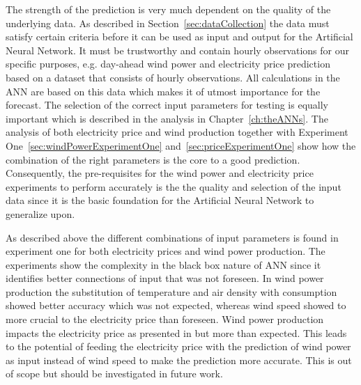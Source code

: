 The strength of the prediction is very much dependent on the quality of the underlying data. As described in Section~\ref{sec:dataCollection} the data must satisfy certain criteria before it can be used as input and output for the Artificial Neural Network. It must be trustworthy and contain hourly observations for our specific purposes, e.g. day-ahead wind power and electricity price prediction based on a dataset that consists of hourly observations. All calculations in the ANN are based on this data which makes it of utmost importance for the forecast. The selection of the correct input parameters for testing is equally important which is described in the analysis in Chapter~\ref{ch:theANNs}. The analysis of both electricity price and wind production together with Experiment One~\ref{sec:windPowerExperimentOne} and~\ref{sec:priceExperimentOne} show how the combination of the right parameters is the core to a good prediction. Consequently, the pre-requisites for the wind power and electricity price experiments to perform accurately is the the quality and selection of the input data since it is the basic foundation for the Artificial Neural Network to generalize upon. 

As described above the different combinations of input parameters is found in experiment one for both electricity prices and wind power production. The experiments show the complexity in the black box nature of ANN since it identifies better connections of input that was not foreseen. In wind power production the substitution of temperature and air density with consumption showed better accuracy which was not expected, whereas wind speed showed to more crucial to the electricity price than foreseen. Wind power production impacts the electricity price as presented in \cite{dayAheadImpactOfWindPowerForecasts} but more than expected. This leads to the potential of feeding the electricity price with the prediction of wind power as input instead of wind speed to make the prediction more accurate. This is out of scope but should be investigated in future work.

